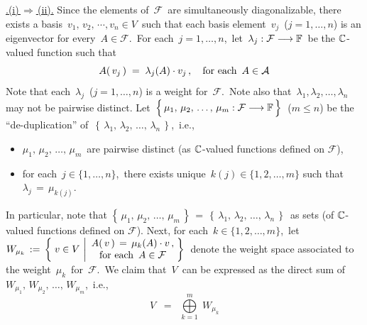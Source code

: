 \vskip 0.1cm
\noindent
\underline{{\color{white}.}(i)\,$\Longrightarrow$\,(ii){\color{white}.}}
\vskip 0.2cm
\noindent
Since the elements of \,$\mathcal{F}$\, are simultaneously diagonalizable,
there exists a basis \,$v_{1},\, v_{2},\, \cdots, v_{n} \in V$\,
such that each basis element \,$v_{j}$\, ($j = 1, \ldots, n$) is an eigenvector
for every \,$A \in \mathcal{F}$.\,
For each \,$j = 1, \ldots, n$,\, let
\,$\lambda_{j} : \mathcal{F} \longrightarrow \mathbb{F}$\,
be the $\mathbb{C}$-valued function such that
\begin{equation*}
A(\,v_{j}\,)
\; = \;
    \lambda_{j}(A) \cdot v_{j}\,,
\quad
\textnormal{for each \,$A \in \mathcal{A}$}
\end{equation*}
Note that each \,$\lambda_{j}$\, ($j = 1, \ldots, n$) is a weight for \,$\mathcal{F}$.\,
Note also that \,$\lambda_{1}, \lambda_{2}, \ldots, \lambda_{n}$\, may not be pairwise distinct.
Let
\,$
\left\{\,
    \mu_{1},\, \mu_{2},\, \ldots,\, \mu_{m} :
    \mathcal{F}
    \overset{{\color{white}1}}{\longrightarrow}
    \F
    \,\right\}
$\,
($m \leq n$) be the ``de-duplication'' of
\,$\left\{\,\lambda_{1},\, \lambda_{2},\, \ldots,\, \lambda_{n}\,\right\}$,\,
i.e.,
\begin{itemize}
\item
    $\mu_{1},\, \mu_{2},\, \ldots,\, \mu_{m}$\, are pairwise distinct
    (as $\mathbb{C}$-valued functions defined on $\mathcal{F}$),
\item
    for each \,$j \in \{1,\ldots,n\}$,\, there exists unique
    \,$k(j) \in \{1,2,\ldots,m\}$ such that
    \,$\lambda_{j} \,=\, \mu_{k(j)}$.
\end{itemize}
In particular, note that
$
\left\{\,
    \mu_{1},\, \mu_{2},\, \ldots,\, \mu_{m}
    \,\right\}
\, = \,
\left\{\,
    \lambda_{1},\, \lambda_{2},\, \ldots,\, \lambda_{n}
    \,\right\}
$\,
as sets (of $\mathbb{C}$-valued functions defined on $\mathcal{F}$).
Next, for each \,$k \in \{1,2,\ldots,m\}$,\, let
\,$
W_{\mu_{k}}
\, := \,
    \left\{\;
        v \in V
        \,\left\vert
        \begin{array}{c}
            A(\,v\,) \,=\, \mu_{k}(A) \cdot v\,,
            \\
            \textnormal{for each \,$A \in \mathcal{F}$}
            \end{array}
        \right.
        \!\!\right\}
$\,
denote the weight space associated to the weight \,$\mu_{k}$\, for \,$\mathcal{F}$.\,
We claim that \,$V$\, can be expressed as the direct sum of
\,$W_{\mu_{1}},\, W_{\mu_{2}},\, \ldots,\, W_{\mu_{m}}$,\, i.e.,
\begin{equation*}
V \;\; = \;\; \overset{m}{\underset{k=1}{\bigoplus}}\;W_{\mu_{k}}
\end{equation*}
